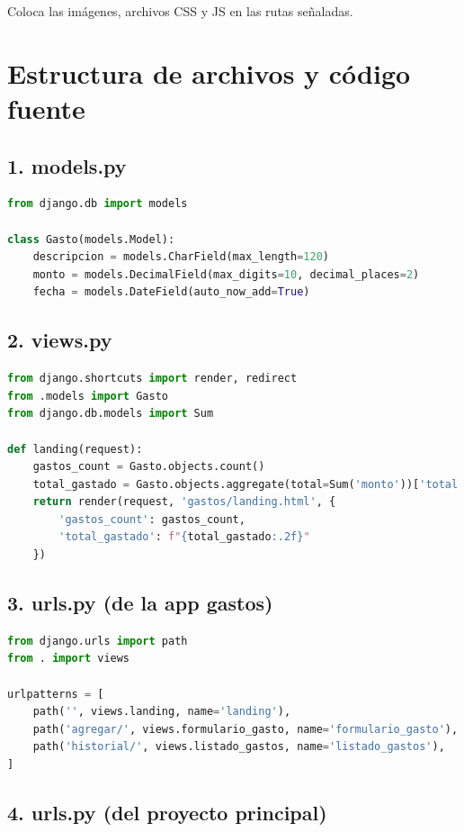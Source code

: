 \documentclass[12pt,a4paper]{article}
\begin{document}
Coloca las imágenes, archivos CSS y JS en las rutas señaladas.


\section{Estructura de archivos y código fuente}

\subsection{1. models.py}

\begin{lstlisting}[language=Python]
from django.db import models

class Gasto(models.Model):
    descripcion = models.CharField(max_length=120)
    monto = models.DecimalField(max_digits=10, decimal_places=2)
    fecha = models.DateField(auto_now_add=True)
\end{lstlisting}

\subsection{2. views.py}

\begin{lstlisting}[language=Python]
from django.shortcuts import render, redirect
from .models import Gasto
from django.db.models import Sum

def landing(request):
    gastos_count = Gasto.objects.count()
    total_gastado = Gasto.objects.aggregate(total=Sum('monto'))['total'] or 0
    return render(request, 'gastos/landing.html', {
        'gastos_count': gastos_count,
        'total_gastado': f"{total_gastado:.2f}"
    })
\end{lstlisting}

\subsection{3. urls.py (de la app gastos)}

\begin{lstlisting}[language=Python]
from django.urls import path
from . import views

urlpatterns = [
    path('', views.landing, name='landing'),
    path('agregar/', views.formulario_gasto, name='formulario_gasto'),
    path('historial/', views.listado_gastos, name='listado_gastos'),
]
\end{lstlisting}

\subsection{4. urls.py (del proyecto principal)}
\end{document}
